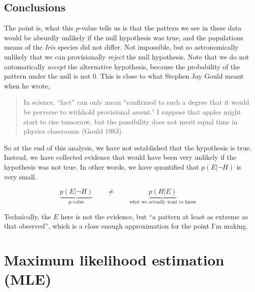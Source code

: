 \documentclass[
  13,
  letterpaper,
]{report}
\begin{document}
\subsection{Conclusions}\label{sec-intro-nhst-conc}

The point is, what this \emph{p}-value tells us is that the pattern we
see in these data would be absurdly unlikely if the null hypothesis was
true, and the populations means of the \emph{Iris} species did not
differ. Not impossible, but so astronomically unlikely that we can
provisionally \emph{reject} the null hypothesis. Note that we do not
automatically \emph{accept} the alternative hypothesis, because the
probability of the pattern under the null is not 0. This is close to
what Stephen Jay Gould meant when he wrote,

\begin{quote}
In science, ``fact'' can only mean ``confirmed to such a degree that it
would be perverse to withhold provisional assent.'' I suppose that
apples might start to rise tomorrow, but the possibility does not merit
equal time in physics classrooms (Gould 1983).
\end{quote}

So at the end of this analysis, we have not established that the
hypothesis is true. Instead, we have collected evidence that would have
been very unlikely if the hypothesis was not true. In other words, we
have quantified that \(p\left(E|\lnot H\right)\) is very small.

\[\underbrace{p\left(E|\lnot H\right)}_{\text{p-value}}\qquad\neq\qquad \underbrace{p\left(H|E\right)}_{\text{what we actually want to know}}\]

\begin{tcolorbox}[enhanced jigsaw, arc=.35mm, bottomrule=.15mm, bottomtitle=1mm, breakable, colback=white, colbacktitle=quarto-callout-note-color!10!white, colframe=quarto-callout-note-color-frame, coltitle=black, left=2mm, leftrule=.75mm, opacityback=0, opacitybacktitle=0.6, rightrule=.15mm, title=\textcolor{quarto-callout-note-color}{\faInfo}\hspace{0.5em}{Note}, titlerule=0mm, toprule=.15mm, toptitle=1mm]

Technically, the \(E\) here is not the evidence, but ``a pattern at
least as extreme as that observed'', which is a close enough
approximation for the point I'm making.

\end{tcolorbox}

\section{Maximum likelihood estimation (MLE)}\label{sec-intro-mle}
\end{document}
